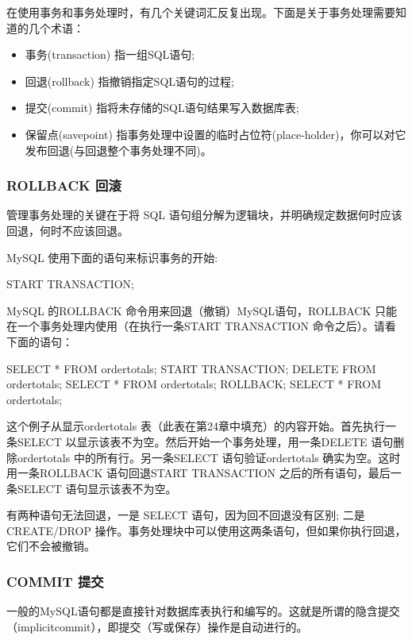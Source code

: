 在使用事务和事务处理时，有几个关键词汇反复出现。下面是关于事务处理需要知道的几个术语：

\begin{itemize}
    \item 事务(transaction) 指一组SQL语句;
    \item 回退(rollback) 指撤销指定SQL语句的过程;
    \item 提交(commit) 指将未存储的SQL语句结果写入数据库表;
    \item 保留点(savepoint) 指事务处理中设置的临时占位符(place-holder)，你可以对它发布回退(与回退整个事务处理不同)。
\end{itemize}

\subsubsection{ROLLBACK 回滚}

管理事务处理的关键在于将 SQL 语句组分解为逻辑块，并明确规定数据何时应该回退，何时不应该回退。

MySQL 使用下面的语句来标识事务的开始:
\begin{sql}
START TRANSACTION;
\end{sql}

MySQL 的ROLLBACK 命令用来回退（撤销）MySQL语句，ROLLBACK 只能在一个事务处理内使用（在执行一条START TRANSACTION 命令之后）。请看下面的语句：

\begin{sql}
SELECT * FROM ordertotals;
START TRANSACTION;
DELETE FROM ordertotals;
SELECT * FROM ordertotals;
ROLLBACK;
SELECT * FROM ordertotals;
\end{sql}

这个例子从显示ordertotals 表（此表在第24章中填充）的内容开始。首先执行一条SELECT 以显示该表不为空。然后开始一个事务处理，用一条DELETE 语句删除ordertotals 中的所有行。另一条SELECT 语句验证ordertotals 确实为空。这时用一条ROLLBACK 语句回退START TRANSACTION 之后的所有语句，最后一条SELECT 语句显示该表不为空。

有两种语句无法回退，一是 SELECT 语句，因为回不回退没有区别; 二是 CREATE/DROP 操作。事务处理块中可以使用这两条语句，但如果你执行回退，它们不会被撤销。

\subsubsection{COMMIT 提交}

一般的MySQL语句都是直接针对数据库表执行和编写的。这就是所谓的隐含提交（implicitcommit），即提交（写或保存）操作是自动进行的。


